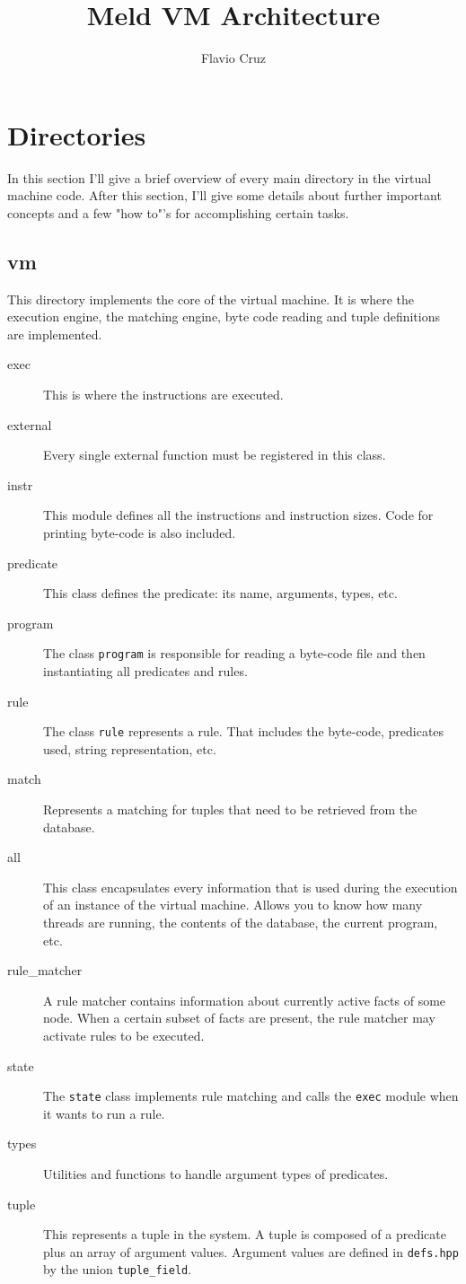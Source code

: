 \documentclass[11pt]{article}
\title{Meld VM Architecture}
\author{Flavio Cruz}
\begin{document}
   
   
\maketitle
   
   
\section{Directories}

In this section I'll give a brief overview of every main directory in the virtual machine code. After this section, I'll give some details about further important concepts and a few "how to"'s for accomplishing certain tasks.

\subsection{vm}

This directory implements the core of the virtual machine. It is where the execution engine, the matching engine, byte code reading and tuple definitions are implemented.

\begin{description}
   \item[exec] This is where the instructions are executed.
   \item[external] Every single external function must be registered in this class.
   \item[instr] This module defines all the instructions and instruction sizes. Code for printing byte-code is also included.
   \item[predicate] This class defines the predicate: its name, arguments, types, etc.
   \item[program] The class \texttt{program} is responsible for reading a byte-code file and then instantiating all predicates and rules.
   \item[rule] The class \texttt{rule} represents a rule. That includes the byte-code, predicates used, string representation, etc.
   \item[match] Represents a matching for tuples that need to be retrieved from the database.
   \item[all] This class encapsulates every information that is used during the execution of an instance of the virtual machine. Allows you to know how many threads are running, the contents of the database, the current program, etc.
   \item[rule\_matcher] A rule matcher contains information about currently active facts of some node. When a certain subset of facts are present, the rule matcher may activate rules to be executed.
   \item[state] The \texttt{state} class implements rule matching and calls the \texttt{exec} module when it wants to run a rule.
   \item[types] Utilities and functions to handle argument types of predicates.
   \item[tuple] This represents a tuple in the system. A tuple is composed of a predicate plus an array of argument values. Argument values are defined in \texttt{defs.hpp} by the union \texttt{tuple\_field}.
\end{description}
\end{document}
